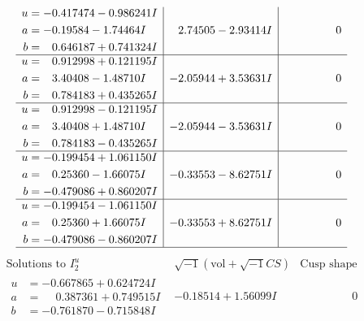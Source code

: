 \documentclass[1p]{elsarticle_modified}
\theoremstyle{definition}
\newcommand{\I}{\sqrt{-1}}
\begin{document}
$$\begin{array}{c|c|c}
\begin{aligned}
u &= -0.417474 - 0.986241 I \\
a &= -0.19584 - 1.74464 I \\
b &= \phantom{-}0.646187 + 0.741324 I\end{aligned}
 & \phantom{-}2.74505 - 2.93414 I & \phantom{-0.000000 } 0 \\ \hline\begin{aligned}
u &= \phantom{-}0.912998 + 0.121195 I \\
a &= \phantom{-}3.40408 - 1.48710 I \\
b &= \phantom{-}0.784183 + 0.435265 I\end{aligned}
 & -2.05944 + 3.53631 I & \phantom{-0.000000 } 0 \\ \hline\begin{aligned}
u &= \phantom{-}0.912998 - 0.121195 I \\
a &= \phantom{-}3.40408 + 1.48710 I \\
b &= \phantom{-}0.784183 - 0.435265 I\end{aligned}
 & -2.05944 - 3.53631 I & \phantom{-0.000000 } 0 \\ \hline\begin{aligned}
u &= -0.199454 + 1.061150 I \\
a &= \phantom{-}0.25360 - 1.66075 I \\
b &= -0.479086 + 0.860207 I\end{aligned}
 & -0.33553 - 8.62751 I & \phantom{-0.000000 } 0 \\ \hline\begin{aligned}
u &= -0.199454 - 1.061150 I \\
a &= \phantom{-}0.25360 + 1.66075 I \\
b &= -0.479086 - 0.860207 I\end{aligned}
 & -0.33553 + 8.62751 I & \phantom{-0.000000 } 0\\
 \hline 
 \end{array}$$\newpage$$\begin{array}{c|c|c}  
\text{Solutions to }I^u_{2}& \I (\text{vol} + \sqrt{-1}CS) & \text{Cusp shape}\\
 \hline 
\begin{aligned}
u &= -0.667865 + 0.624724 I \\
a &= \phantom{-}0.387361 + 0.749515 I \\
b &= -0.761870 - 0.715848 I\end{aligned}
 & -0.18514 + 1.56099 I & \phantom{-0.000000 } 0 \\ \hline\begin{aligned}

\end{aligned}
\end{array}$$
\end{document}
